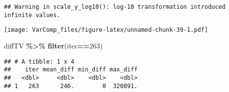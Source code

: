 \documentclass[
]{article}
\newenvironment{Shaded}{\begin{snugshade}}{\end{snugshade}}
\newcommand{\DecValTok}[1]{\textcolor[rgb]{0.00,0.00,0.81}{#1}}
\newcommand{\FunctionTok}[1]{\textcolor[rgb]{0.13,0.29,0.53}{\textbf{#1}}}
\newcommand{\NormalTok}[1]{#1}
\newcommand{\SpecialCharTok}[1]{\textcolor[rgb]{0.81,0.36,0.00}{\textbf{#1}}}
\begin{document}
\begin{verbatim}
## Warning in scale_y_log10(): log-10 transformation introduced infinite values.
\end{verbatim}

\texttt{[image: VarComp\_files/figure-latex/unnamed-chunk-39-1.pdf]}

\begin{Shaded}
\begin{Highlighting}[]
\NormalTok{diffTV }\SpecialCharTok{\%\textgreater{}\%} 
  \FunctionTok{filter}\NormalTok{(iter}\SpecialCharTok{==}\DecValTok{263}\NormalTok{)}
\end{Highlighting}
\end{Shaded}

\begin{verbatim}
## # A tibble: 1 x 4
##    iter mean_diff min_diff max_diff
##   <dbl>     <dbl>    <dbl>    <dbl>
## 1   263      246.        0  320891.
\end{verbatim}
\end{document}
